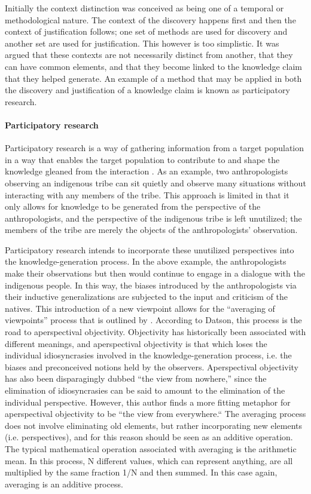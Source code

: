 \documentclass[a4paper]{article}
\begin{document}
Initially the context distinction was conceived as being one of a temporal or
methodological nature. The context of the discovery happens first and then the
context of justification follows; one set of methods are used for discovery
and another set are used for justification. This however is too simplistic.
It was argued that these contexts are not necessarily distinct from another,
that they can have common elements, and that they become linked to the
knowledge claim that they helped generate.  An example of a method that may be
applied in both the discovery and justification of a knowledge claim is known
as participatory research.

\paragraph{Participatory research}
\label{part}

Participatory research is a way of gathering information from a target
population in a way that enables the target population to contribute to and
shape the knowledge gleaned from the interaction
\cite{bergold2012participatory}. As an example, two anthropologists observing
an indigenous tribe can sit quietly and observe many situations without
interacting with any members of the tribe. This approach is limited in that it
only allows for knowledge to be generated from the perspective of the
anthropologists, and the perspective of the indigenous tribe is left
unutilized; the members of the tribe are merely the objects of the
anthropologists' observation. 

Participatory research intends to incorporate these unutilized perspectives
into the knowledge-generation process. In the above example, the
anthropologists make their observations but then would continue to engage in a
dialogue with the indigenous people. In this way, the biases introduced by the
anthropologists via their inductive generalizations are subjected to the input
and criticism of the natives. This introduction of a new viewpoint allows for
the ``averaging of viewpoints'' process that is outlined by
\cite{datson1992objectivity}. According to Datson, this process is the road to
aperspectival objectivity. Objectivity has historically been associated with
different meanings, and aperspectival objectivity is that which loses the
individual idiosyncrasies involved in the knowledge-generation process, i.e.
the biases and preconceived notions held by the observers.  Aperspectival
objectivity has also been disparagingly dubbed ``the view from nowhere,''
since the elimination of idiosyncrasies can be said to amount to the
elimination of the individual perspective. However, this author finds a more
fitting metaphor for aperspectival objectivity to be ``the view from
everywhere.`` The averaging process does not involve eliminating old elements,
but rather incorporating new elements (i.e.  perspectives), and for this
reason should be seen as an additive operation.  The typical mathematical
operation associated with averaging is the arithmetic mean. In this process, N
different values, which can represent anything, are all multiplied by the same
fraction 1/N and then summed. In this case again, averaging is an additive
process.
\end{document}
